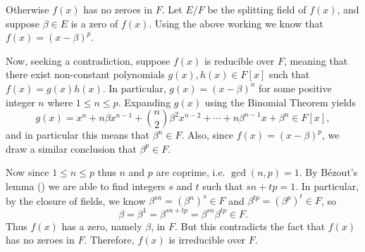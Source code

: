 \begin{questions}
    Otherwise $f(x)$ has no zeroes in $F$. Let $E/F$ be the splitting field of $f(x)$, and suppose $\beta \in E$ is a zero of $f(x)$. Using the above working we know that $f(x) = (x-\beta)^p$.

    Now, seeking a contradiction, suppose $f(x)$ is reducible over $F$, meaning that there exist non-constant polynomials $g(x), h(x) \in F[x]$ such that $f(x) = g(x)h(x)$. In particular, $g(x) = (x-\beta)^n$ for some positive integer $n$ where $1 \leq n \leq p$. Expanding $g(x)$ using the Binomial Theorem yields
    \[
        g(x) = x^n + n\beta x^{n-1} + {n\choose2}\beta^2x^{n-2} + \cdots + n\beta^{n-1}x + \beta^n \in F[x],
    \]
    and in particular this means that $\beta^n \in F$. Also, since $f(x) = (x-\beta)^p$, we draw a similar conclusion that $\beta^p \in F$.

    Now since $1 \leq n \leq p$ thus $n$ and $p$ are coprime, i.e. $\gcd(n,p) = 1$. By B\'ezout's lemma () we are able to find integers $s$ and $t$ such that $sn + tp = 1$. In particular, by the closure of fields, we know $\beta^{sn} = \left(\beta^n\right)^s \in F$ and $\beta^{tp} = \left(\beta^p\right)^t \in F$, so
    \[
        \beta = \beta^1 = \beta^{sn+tp} = \beta^{sn}\beta^{tp} \in F.
    \]
    Thus $f(x)$ has a zero, namely $\beta$, in $F$. But this contradicts the fact that $f(x)$ has no zeroes in $F$. Therefore, $f(x)$ is irreducible over $F$.
\end{questions}
